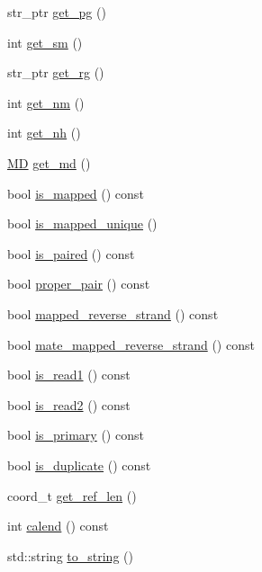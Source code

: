 \begin{DoxyCompactItemize}
str\_\-ptr \hyperlink{class_b_a_m_read_a3db15b68f63c8e263a9b08874404f522}{get\_\-pg} ()
\item 
int \hyperlink{class_b_a_m_read_af8aa1684299833e57837b4fde4298ea9}{get\_\-sm} ()
\item 
str\_\-ptr \hyperlink{class_b_a_m_read_ac8b4d5ec304d8fa8c75dcac71e38759f}{get\_\-rg} ()
\item 
int \hyperlink{class_b_a_m_read_a551b6a6a5c2946c8a29fa4c1ebbfab02}{get\_\-nm} ()
\item 
int \hyperlink{class_b_a_m_read_aa54edc07ecf6aff07a1475a993776338}{get\_\-nh} ()
\item 
\hyperlink{class_m_d}{MD} \hyperlink{class_b_a_m_read_a58f99aed61006fb9b4a4a3115382ca18}{get\_\-md} ()
\item 
bool \hyperlink{class_b_a_m_read_ac6e68fb8c75b6f722024a81ab5866d92}{is\_\-mapped} () const 
\item 
bool \hyperlink{class_b_a_m_read_abee0c3fd935865fb8bde955931a66d80}{is\_\-mapped\_\-unique} ()
\item 
bool \hyperlink{class_b_a_m_read_ac42757573fe5d30cc8725124fd28fd2b}{is\_\-paired} () const 
\item 
bool \hyperlink{class_b_a_m_read_a12218736728585c3ad8e22be41e63b8a}{proper\_\-pair} () const 
\item 
bool \hyperlink{class_b_a_m_read_a2bf6db37d6f73fdd6cf1ef233efa46d0}{mapped\_\-reverse\_\-strand} () const 
\item 
bool \hyperlink{class_b_a_m_read_adbc2990ced7211feb13c382eb9d0ae93}{mate\_\-mapped\_\-reverse\_\-strand} () const 
\item 
bool \hyperlink{class_b_a_m_read_aaf25681f4fc846f4718cbc440d6a038a}{is\_\-read1} () const 
\item 
bool \hyperlink{class_b_a_m_read_a7b0214dc321ad06f766d5bbde98e38d5}{is\_\-read2} () const 
\item 
bool \hyperlink{class_b_a_m_read_a77171be799f523f1b5b14cdcecbee1e0}{is\_\-primary} () const 
\item 
bool \hyperlink{class_b_a_m_read_a19a7b642813b3bb41acfed7ccf11a4bc}{is\_\-duplicate} () const 
\item 
coord\_\-t \hyperlink{class_b_a_m_read_a612a3a20a299d8ecb8fc4d9b87a3d5ac}{get\_\-ref\_\-len} ()
\item 
int \hyperlink{class_b_a_m_read_a2bd07073d526f48485c2ac034572b3c4}{calend} () const 
\item 
std::string \hyperlink{class_b_a_m_read_a952441067ff9c1ec819dc1819964e0b3}{to\_\-string} ()
\end{DoxyCompactItemize}



